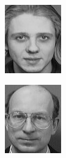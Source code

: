 \begin{frame}
\begin{columns}
\begin{overlayarea}{\textwidth}{\textheight}
\begin{minipage}[t]{0.15\textwidth}
        \includegraphics[width=\textwidth]{images/celebrity_images/s12_1.jpg}
      \end{minipage}
      \begin{minipage}[t]{0.15\textwidth}
        \includegraphics[width=\textwidth]{images/celebrity_images/s13_1.jpg}

\end{minipage}
\end{overlayarea}
\end{columns}
\end{frame}
